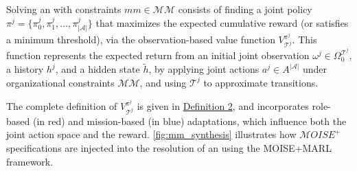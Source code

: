 Solving an  with constraints $mm \in \mathcal{MM}$ consists of finding a joint policy $\pi^j = \{\pi^j_0, \pi^j_1, \dots, \pi^j_{|\mathcal{A}|}\}$ that maximizes the expected cumulative reward (or satisfies a minimum threshold), via the observation-based value function $V_{\mathcal{T}^j}^{\pi^j}$. This function represents the expected return from an initial joint observation $\omega^j \in \Omega^{\mathcal{T}^j} _0$, a history $h^j$, and a hidden state $\tilde{h}$, by applying joint actions $a^j \in A^{|\mathcal{A}|}$ under organizational constraints $\mathcal{MM}$, and using $\mathcal{T}^j$ to approximate transitions.

The complete definition of $V_{\mathcal{T}^j}^{\pi^j}$ is given in \hyperref[eq:single_value_function_parallel]{Definition 2}, and incorporates role-based (in red) and mission-based (in blue) adaptations, which influence both the joint action space and the reward. \autoref{fig:mm_synthesis} illustrates how $\mathcal{M}OISE^+$ specifications are injected into the resolution of an  using the MOISE+MARL framework.

\medskip

